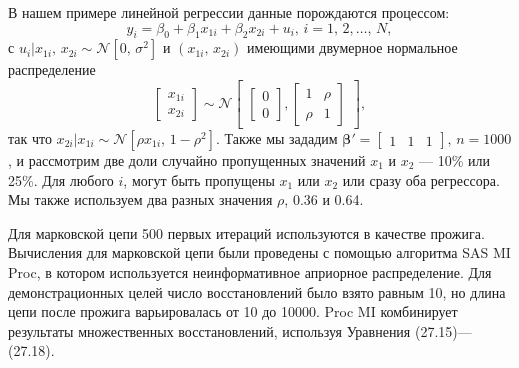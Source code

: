 В нашем примере линейной регрессии данные порождаются процессом:
\begin{equation}
y_i=\beta_0+\beta_1 x_{1i}+\beta_2 x_{2i}+u_i, \, i=1, \, 2, \dots , \, N,
\end{equation}
с $u_i|x_{1i}, \, x_{2i} \sim \mathcal{N}[0, \, \sigma^2]$ и $(x_{1i}, \, x_{2i})$ имеющими двумерное нормальное распределение
\begin{equation}
\begin{bmatrix}
x_{1i} \\ x_{2i}
\end{bmatrix}
\sim \mathcal{N}
\begin{bmatrix}
\begin{bmatrix} 0 \\ 0 \end{bmatrix}, \begin{bmatrix} 1 & \rho \\ \rho & 1 \end{bmatrix}
\end{bmatrix},
\end{equation}
так что $x_{2i}|x_{1i} \sim \mathcal{N}[\rho x_{1i}, \, 1-\rho^2]$. Также мы зададим $\mathbf{\beta'}=\begin{bmatrix} 1 & 1 & 1 \end{bmatrix}, \, n=1000$, и рассмотрим две доли случайно пропущенных значений $x_1$ и $x_2$ --- 10\% или 25\%. Для любого $i$, могут быть пропущены $x_1$ или $x_2$ или сразу оба регрессора. Мы также используем два разных значения $\rho$, 0.36 и 0.64.

Для марковской цепи 500 первых итераций используются в качестве прожига. Вычисления для марковской цепи были проведены с помощью алгоритма SAS MI Proc, в котором используется неинформативное априорное распределение. Для демонстрационных целей число восстановлений было взято равным 10, но длина цепи после прожига варьировалась от 10 до 10000. Proc MI комбинирует результаты множественных восстановлений, используя Уравнения (27.15)—(27.18).



